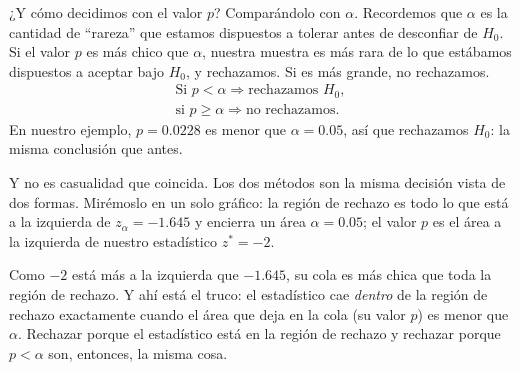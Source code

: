 ¿Y cómo decidimos con el valor \(p\)? Comparándolo con \(\alpha\). Recordemos que \(\alpha\) es la cantidad de \enquote{rareza} que estamos dispuestos a tolerar antes de desconfiar de \(H_0\). Si el valor \(p\) es más chico que \(\alpha\), nuestra muestra es más rara de lo que estábamos dispuestos a aceptar bajo \(H_0\), y rechazamos. Si es más grande, no rechazamos. 
\begin{gather*}
\text{Si } p<\alpha \Rightarrow \text{rechazamos } H_0,\\
\text{si } p\geq\alpha \Rightarrow \text{no rechazamos.}
\end{gather*}
En nuestro ejemplo, \(p=\num{0,0228}\) es menor que \(\alpha=\num{0,05}\), así que rechazamos \(H_0\): la misma conclusión que antes.

Y no es casualidad que coincida. Los dos métodos son la misma decisión vista de dos formas. Mirémoslo en un solo gráfico: la región de rechazo es todo lo que está a la izquierda de \(z_\alpha=-\num{1,645}\) y encierra un área \(\alpha=\num{0,05}\); el valor \(p\) es el área a la izquierda de nuestro estadístico \(z^*=-2\).


Como \(-2\) está más a la izquierda que \(-\num{1,645}\), su cola es más chica que toda la región de rechazo. Y ahí está el truco: el estadístico cae \emph{dentro} de la región de rechazo exactamente cuando el área que deja en la cola (su valor \(p\)) es menor que \(\alpha\). Rechazar porque el estadístico está en la región de rechazo y rechazar porque \(p<\alpha\) son, entonces, la misma cosa.

